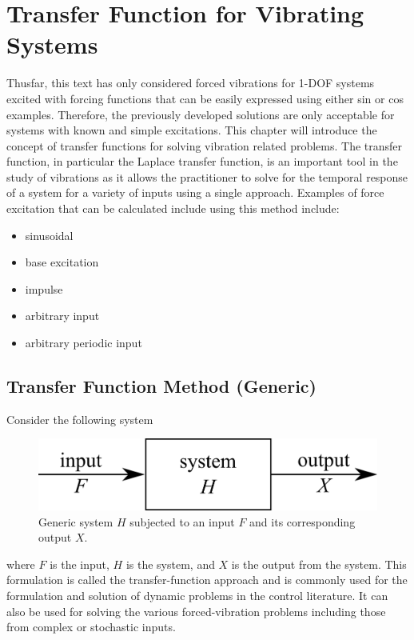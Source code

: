 \documentclass[12pt,letter]{article}
\numberwithin{ex}{section} %
\numberwithin{re}{section} %
\begin{document}
	\large{}
	
	\setcounter{section}{3}
	\section{Transfer Function for Vibrating Systems}

		Thusfar, this text has only considered forced vibrations for 1-DOF systems excited with forcing functions that can be easily expressed using either sin or cos examples. Therefore, the previously developed solutions are only acceptable for systems with known and simple excitations. This chapter will introduce the concept of transfer functions for solving vibration related problems. The transfer function, in particular the Laplace transfer function, is an important tool in the study of vibrations as it allows the practitioner to solve for the temporal response of a system for a variety of inputs using a single approach. Examples of force excitation that can be calculated include using this method include:
		\begin{itemize}
			\item sinusoidal
			\item base excitation
			\item impulse
			\item arbitrary input
			\item arbitrary periodic input
		\end{itemize}


		\subsection{Transfer Function Method (Generic)}
			Consider the following system

			\begin{figure}[H]
				\centering
				\includegraphics[]{../Figures/control_system.png}
				\caption{Generic system $H$ subjected to an input $F$ and its corresponding output $X$.}
				\label{fig:control_system}
			\end{figure}

			\noindent where $F$ is the input, $H$ is the system, and $X$ is the output from the system. This formulation is called the transfer-function approach and is commonly used for the formulation and solution of dynamic problems in the control literature. It can also be used for solving the various forced-vibration problems including those from complex or stochastic inputs. 
\end{document}
